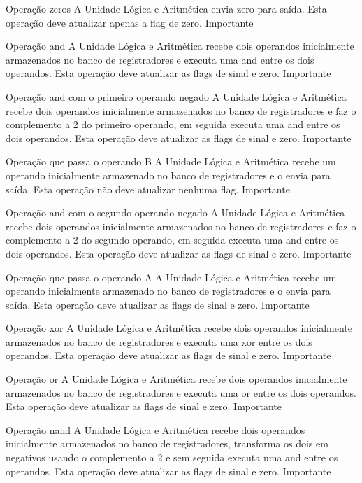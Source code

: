 \documentclass{report}
\begin{document}
\begin{functional}
       \requirement
      {Operação zeros}
      {A Unidade Lógica e Aritmética envia zero para saída. Esta operação deve atualizar apenas a flag de zero.}
      {Importante}
      
      \requirement
      {Operação and}
      {A Unidade Lógica e Aritmética recebe dois operandos inicialmente armazenados no banco de registradores e executa uma and entre os dois operandos. Esta operação deve atualizar as flags de sinal e zero.}
      {Importante}
      
      \requirement
      {Operação and com o primeiro operando negado}
      {A Unidade Lógica e Aritmética recebe dois operandos inicialmente armazenados no banco de registradores e faz o complemento a 2 do primeiro operando, em seguida executa uma and entre os dois operandos. Esta operação deve atualizar as flags de sinal e zero.}
      {Importante}
      
      \requirement
      {Operação que passa o operando B}
      {A Unidade Lógica e Aritmética recebe um operando inicialmente armazenado no banco de registradores e o envia para saída. Esta operação não deve atualizar nenhuma flag.}
      {Importante}
      
      \requirement
      {Operação and com o segundo operando negado}
      {A Unidade Lógica e Aritmética recebe dois operandos inicialmente armazenados no banco de registradores e faz o complemento a 2 do segundo operando, em seguida executa uma and entre os dois operandos. Esta operação deve atualizar as flags de sinal e zero.}
      {Importante}
      
      \requirement
      {Operação que passa o operando A}
      {A Unidade Lógica e Aritmética recebe um operando inicialmente armazenado no banco de registradores e o envia para saída. Esta operação deve atualizar as flags de sinal e zero.}
      {Importante}
      
      \requirement
      {Operação xor}
      {A Unidade Lógica e Aritmética recebe dois operandos inicialmente armazenados no banco de registradores e executa uma xor entre os dois operandos. Esta operação deve atualizar as flags de sinal e zero.}
      {Importante}
      
      \requirement
      {Operação or}
      {A Unidade Lógica e Aritmética recebe dois operandos inicialmente armazenados no banco de registradores e executa uma or entre os dois operandos. Esta operação deve atualizar as flags de sinal e zero.}
      {Importante}
      
      \requirement
      {Operação nand}
      {A Unidade Lógica e Aritmética recebe dois operandos inicialmente armazenados no banco de registradores, transforma os dois em negativos usando o complemento a 2 e sem seguida executa uma and entre os  operandos. Esta operação deve atualizar as flags de sinal e zero.}
      {Importante}
      

\end{functional}
\end{document}
